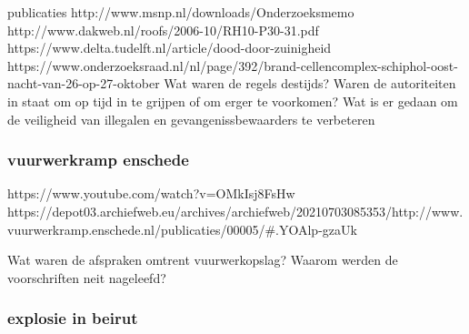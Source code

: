 publicaties
http://www.msnp.nl/downloads/Onderzoeksmemo%
http://www.dakweb.nl/roofs/2006-10/RH10-P30-31.pdf
https://www.delta.tudelft.nl/article/dood-door-zuinigheid
https://www.onderzoeksraad.nl/nl/page/392/brand-cellencomplex-schiphol-oost-nacht-van-26-op-27-oktober
Wat waren de regels destijds?
Waren de autoriteiten in staat om op tijd in te grijpen of om erger te voorkomen?
Wat is er gedaan om de veiligheid van illegalen en gevangenissbewaarders te verbeteren


\subsubsection{vuurwerkramp enschede}

https://www.youtube.com/watch?v=OMkIsj8FsHw
https://depot03.archiefweb.eu/archives/archiefweb/20210703085353/http://www.vuurwerkramp.enschede.nl/publicaties/00005/#.YOAlp-gzaUk

Wat waren de afspraken omtrent vuurwerkopslag?
Waarom werden de voorschriften neit nageleefd?



\subsubsection{explosie in beirut}

